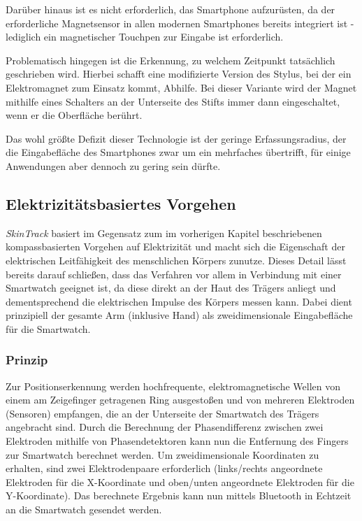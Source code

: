 Darüber hinaus ist es nicht erforderlich, das Smartphone aufzurüsten, da der erforderliche Magnetsensor in allen modernen Smartphones bereits integriert ist - lediglich ein magnetischer Touchpen zur Eingabe ist erforderlich.

Problematisch hingegen ist die Erkennung, zu welchem Zeitpunkt tatsächlich geschrieben wird. Hierbei schafft eine modifizierte Version des Stylus, bei der ein Elektromagnet zum Einsatz kommt, Abhilfe. Bei dieser Variante wird der Magnet mithilfe eines Schalters an der Unterseite des Stifts immer dann eingeschaltet, wenn er die Oberfläche berührt.

Das wohl größte Defizit dieser Technologie ist der geringe Erfassungsradius, der die Eingabefläche des Smartphones zwar um ein mehrfaches übertrifft, für einige Anwendungen aber dennoch zu gering sein dürfte.

\subsection{Elektrizitätsbasiertes Vorgehen}\label{SkinTrack}

\textit{SkinTrack} \cite{Zhang.2015} basiert im Gegensatz zum im vorherigen Kapitel beschriebenen kompassbasierten Vorgehen auf Elektrizität und macht sich die Eigenschaft der elektrischen Leitfähigkeit des menschlichen Körpers zunutze. Dieses Detail lässt bereits darauf schließen, dass das Verfahren vor allem in Verbindung mit einer Smartwatch geeignet ist, da diese direkt an der Haut des Trägers anliegt und dementsprechend die elektrischen Impulse des Körpers messen kann. Dabei dient prinzipiell der gesamte Arm (inklusive Hand) als zweidimensionale Eingabefläche für die Smartwatch.

\subsubsection{Prinzip}
Zur Positionserkennung werden hochfrequente, elektromagnetische Wellen von einem am Zeigefinger getragenen Ring ausgestoßen und von mehreren Elektroden (Sensoren) empfangen, die an der Unterseite der Smartwatch des Trägers angebracht sind. Durch die Berechnung der Phasendifferenz zwischen zwei Elektroden mithilfe von Phasendetektoren kann nun die Entfernung des Fingers zur Smartwatch berechnet werden. Um zweidimensionale Koordinaten zu erhalten, sind zwei Elektrodenpaare erforderlich (links/rechts angeordnete Elektroden für die X-Koordinate und oben/unten angeordnete Elektroden für die Y-Koordinate). Das berechnete Ergebnis kann nun mittels Bluetooth in Echtzeit an die Smartwatch gesendet werden.

